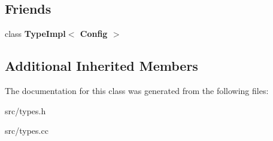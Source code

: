 \subsection*{Friends}
\begin{DoxyCompactItemize}
\item 
\hypertarget{classv8_1_1internal_1_1_type_impl_1_1_bitset_type_aa392ea7d8c94dab30c3aaf8430e0a8af}{}class {\bfseries Type\+Impl$<$ Config $>$}\label{classv8_1_1internal_1_1_type_impl_1_1_bitset_type_aa392ea7d8c94dab30c3aaf8430e0a8af}

\end{DoxyCompactItemize}
\subsection*{Additional Inherited Members}


The documentation for this class was generated from the following files\+:\begin{DoxyCompactItemize}
\item 
src/types.\+h\item 
src/types.\+cc\end{DoxyCompactItemize}
